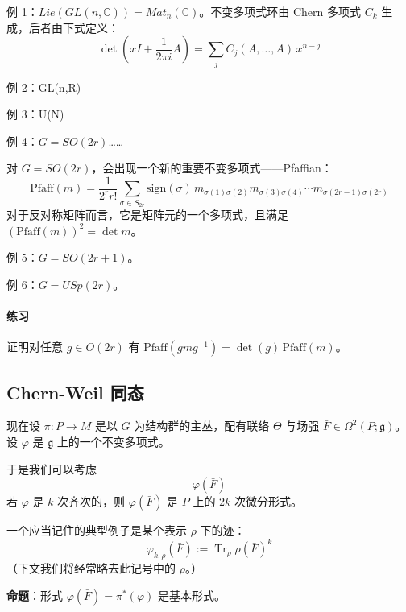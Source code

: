 例 1：$Lie(GL(n,\mathbb{C}))=Mat_n(\mathbb{C})$。不变多项式环由 Chern 多项式 $C_k$ 生成，后者由下式定义：
\begin{equation}
  \det\left(xI+\frac{1}{2\pi i}A\right) = \sum_j C_j(A,\dots,A)\,x^{n-j}
  \tag{I.7}
  \label{eq:I.7}
\end{equation}

例 2：GL(n,R)

例 3：U(N)

例 4：$G=SO(2r)$……

对 $G=SO(2r)$，会出现一个新的重要不变多项式——Pfaffian：
\begin{equation}
  \mathrm{Pfaff}(m) = \frac{1}{2^r r!}\sum_{\sigma\in S_{2r}}\mathrm{sign}(\sigma)\,
  m_{\sigma(1)\sigma(2)}m_{\sigma(3)\sigma(4)}\cdots m_{\sigma(2r-1)\sigma(2r)}
  \tag{I.8}
  \label{eq:I.8}
\end{equation}
对于反对称矩阵而言，它是矩阵元的一个多项式，且满足 $(\mathrm{Pfaff}(m))^2=\det m$。

例 5：$G=SO(2r+1)$。

例 6：$G=USp(2r)$。

\paragraph{练习}
证明对任意 $g\in O(2r)$ 有 $\mathrm{Pfaff}(gmg^{-1})=\det(g)\,\mathrm{Pfaff}(m)$。

\subsection{Chern-Weil 同态} %

现在设 $\pi: P\to M$ 是以 $G$ 为结构群的主丛，配有联络 $\Theta$ 与场强 $\bar F\in\Omega^2(P;\mathfrak{g})$。设 $\varphi$ 是 $\mathfrak{g}$ 上的一个不变多项式。

于是我们可以考虑
\begin{equation}
  \varphi(\bar F)
  \tag{I.9}
  \label{eq:I.9}
\end{equation}
若 $\varphi$ 是 $k$ 次齐次的，则 $\varphi(\bar F)$ 是 $P$ 上的 $2k$ 次微分形式。

一个应当记住的典型例子是某个表示 $\rho$ 下的迹：
\begin{equation}
  \varphi_{k,\rho}(\bar F) := \operatorname{Tr}_\rho \rho(\bar F)^k
  \tag{I.10}
  \label{eq:I.10}
\end{equation}
（下文我们将经常略去此记号中的 $\rho$。）

\textbf{命题}：形式 $\varphi(\bar F)=\pi^*(\bar\varphi)$ 是基本形式。


